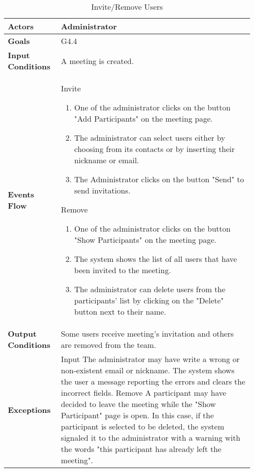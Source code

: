 \begin{table}[H]
	\centering
	\def\arraystretch{1.5}
	\begin{tabular}{|p{7cm}|p{7cm}|}
		\hline
		\textbf{Actors}            & Administrator    \\ \hline
		\textbf{Goals}             & G4.4           \\ \hline
		\textbf{Input Conditions}  & A meeting is created.           \\ \hline
		\textbf{Events Flow}       & Invite 
		\begin{enumerate}[topsep=0pt, leftmargin=*]
			\item One of the administrator clicks on the button "Add Participants" on the meeting page.
			\item The administrator can select users either by choosing from its contacts or by inserting their nickname or email.
			\item The Administrator clicks on the button "Send" to send invitations.
		\end{enumerate}   
		Remove 
		\begin{enumerate}[topsep=0pt, leftmargin=*]
			\item One of the administrator clicks on the button "Show Participants" on the meeting page.
			\item The system shows the list of all users that have been invited to the meeting.
			\item The administrator can delete users from the participants' list by clicking on the "Delete" button next to their name.
		\end{enumerate}            \\ \hline
		\textbf{Output Conditions} & Some users receive meeting's invitation and others are removed from the team.            \\ \hline
		\textbf{Exceptions}        & Input \newline
		The administrator may have write a wrong or non-existent email or nickname. The system shows the user a message reporting the errors and
		clears the incorrect fields. \newline
		Remove \newline
		A participant may have decided to leave the meeting while the "Show Participant" page is open. In this case, if the participant is selected to be deleted, the system signaled it to the administrator with a warning with the words "this participant has already left the meeting".         \\ \hline
	\end{tabular}
	\caption{Invite/Remove Users}
\end{table}

